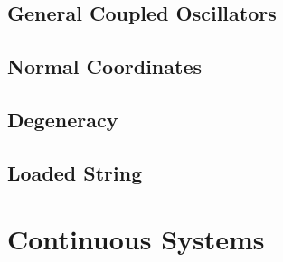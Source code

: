 \subsection{General Coupled Oscillators}

\subsection{Normal Coordinates}

\subsection{Degeneracy}

\subsection{Loaded String}




\newpage
\section{Continuous Systems}
\label{sec:cm-continuous}




